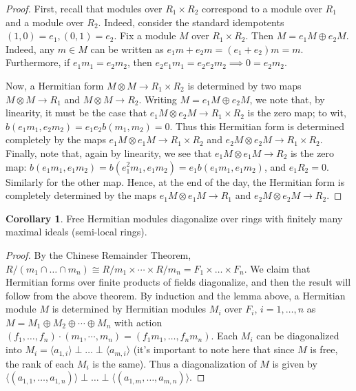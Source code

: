 \documentclass[edeposit,fullpage]{uiucthesis2009}
\theoremstyle{plain}
\numberwithin{lemma}{section}
\theoremstyle{definition}
\newtheorem{corollary}[lemma]{Corollary}
\begin{document}
\begin{proof}
First, recall that modules over $R_1 \times R_2$ correspond to a
module over $R_1$ and a module over $R_2$. Indeed, consider the
standard idempotents $(1,0) = e_1, (0,1) = e_2$. Fix a module $M$ over
$R_1 \times R_2$. Then $M = e_1M \oplus e_2M$. Indeed, any $m \in M$
can be written as $e_1m + e_2m = (e_1+e_2)m = m$. Furthermore, if
$e_1m_1 = e_2m_2$, then $e_2e_1m_1=e_2e_2m_2 \implies 0 = e_2m_2$. 

Now, a Hermitian form $M \otimes M \rightarrow R_1 \times R_2$ is
determined by two maps $M \otimes M \rightarrow R_1$ and $M \otimes M
\rightarrow R_2$. Writing $M = e_1M \oplus e_2M$, we note that, by
linearity, it must be the case that $e_1M \otimes e_2M \rightarrow R_1
\times R_2$ is the zero map; to wit, $b(e_1m_1,e_2m_2) =
e_1e_2b(m_1,m_2) = 0$. Thus this Hermitian form is determined
completely by the maps $e_1M \otimes e_1M \rightarrow R_1 \times R_2$
and $e_2M \otimes e_2M \rightarrow R_1 \times R_2$. Finally, note
that, again by linearity, we see that $e_1M \otimes e_1M \rightarrow
R_2$ is the zero map: $b(e_1m_1,e_1m_2) = b(e_1^2m_1,e_1m_2) =
e_1b(e_1m_1,e_1m_2)$, and $e_1R_2 = 0$. Similarly for the other
map. Hence, at the end of the day, the Hermitian form is completely
determined by the maps $e_1M \otimes e_1M \rightarrow R_1$ and $e_2M
\otimes e_2M \rightarrow R_2$. 
\end{proof}

\begin{corollary}
Free Hermitian modules diagonalize over rings with finitely many maximal
ideals (semi-local rings).
\end{corollary}

\begin{proof}
By the Chinese Remainder Theorem, $R/(m_1 \cap \dots \cap m_n) \cong
R/m_1 \times \cdots \times R/m_n = F_1 \times \dots \times F_n$. We
claim that Hermitian forms over finite products of fields
diagonalize, and then the result will follow from the above theorem. By induction and the lemma above, a Hermitian module $M$
is determined by Hermitian modules $M_i$ over $F_i$, $i =
1,\dots,n$ as $M = M_1 \oplus M_2 \oplus \cdots \oplus M_n$ with
action $(f_1,\dots,f_n) \cdot (m_1,\cdots,m_n) =
(f_1m_1,\dots,f_nm_n)$. Each $M_i$ can be diagonalized into $M_i = \langle a_{1,i}
\rangle \perp \dots \perp \langle a_{m,i}\rangle$ (it's important to
note here that since $M$ is free, the rank of each $M_i$ is the same). Thus a
diagonalization of $M$ is given by $\langle (a_{1,1},\dots,a_{1,n})
\rangle \perp \dots \perp \langle (a_{1,m},
\dots,a_{m,n})\rangle$. 
\end{proof}
\end{document}
